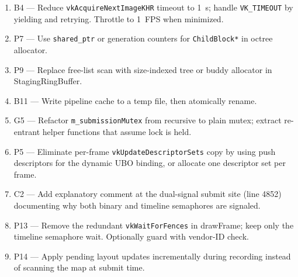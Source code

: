\documentclass[a4paper,12pt]{article}
\begin{document}
\begin{enumerate}[noitemsep]
  \item B4 — Reduce \texttt{vkAcquireNextImageKHR} timeout to 1~s; handle
        \texttt{VK\_TIMEOUT} by yielding and retrying. Throttle to 1~FPS when
        minimized.
  \item P7 — Use \texttt{shared\_ptr} or generation counters for
        \texttt{ChildBlock*} in octree allocator.
  \item P9 — Replace free-list scan with size-indexed tree or buddy allocator
        in StagingRingBuffer.
  \item B11 — Write pipeline cache to a temp file, then atomically rename.
  \item G5 — Refactor \texttt{m\_submissionMutex} from recursive to plain
        mutex; extract re-entrant helper functions that assume lock is held.
  \item P5 — Eliminate per-frame \texttt{vkUpdateDescriptorSets} copy by using
        push descriptors for the dynamic UBO binding, or allocate one
        descriptor set per frame.
  \item C2 — Add explanatory comment at the dual-signal submit site (line 4852)
        documenting why both binary and timeline semaphores are signaled.
  \item P13 — Remove the redundant \texttt{vkWaitForFences} in drawFrame;
        keep only the timeline semaphore wait. Optionally guard with
        vendor-ID check.
  \item P14 — Apply pending layout updates incrementally during recording
        instead of scanning the map at submit time.
\end{enumerate}
\end{document}
